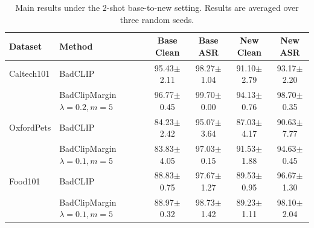\begin{table}[t]
\centering
\caption{Main results under the 2-shot base-to-new setting. Results are averaged over three random seeds.}
\label{tab:main_results_mean_std}
\begin{tabular}{llcccc}
\toprule
Dataset & Method & Base Clean & Base ASR & New Clean & New ASR \\
\midrule
Caltech101 & BadCLIP & 95.43$\pm$2.11 & 98.27$\pm$1.04 & 91.10$\pm$2.79 & 93.17$\pm$2.20 \\
 & BadClipMargin $\lambda=0.2,m=5$ & 96.77$\pm$0.45 & 99.70$\pm$0.00 & 94.13$\pm$0.76 & 98.70$\pm$0.35 \\
\midrule
OxfordPets & BadCLIP & 84.23$\pm$2.42 & 95.07$\pm$3.64 & 87.03$\pm$4.17 & 90.63$\pm$7.77 \\
 & BadClipMargin $\lambda=0.1,m=5$ & 83.83$\pm$4.05 & 97.03$\pm$0.15 & 91.53$\pm$1.88 & 94.63$\pm$0.45 \\
\midrule
Food101 & BadCLIP & 88.83$\pm$0.75 & 97.67$\pm$1.27 & 89.53$\pm$0.95 & 96.67$\pm$1.30 \\
 & BadClipMargin $\lambda=0.1,m=5$ & 88.97$\pm$0.32 & 98.73$\pm$1.42 & 89.23$\pm$1.11 & 98.10$\pm$2.04 \\
\bottomrule
\end{tabular}
\end{table}